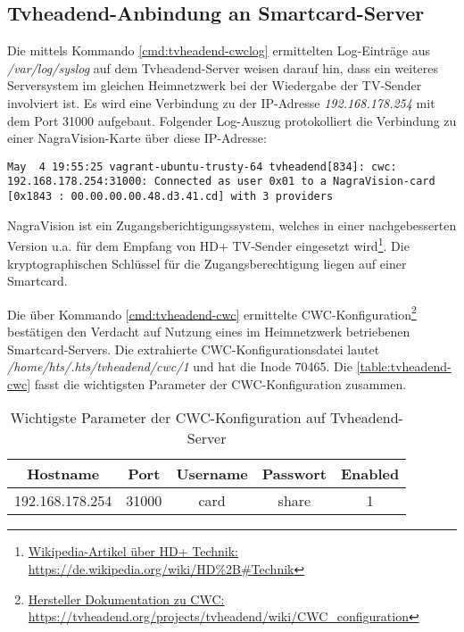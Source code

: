 \subsection{Tvheadend-Anbindung an Smartcard-Server}

Die mittels Kommando \autoref{cmd:tvheadend-cwclog} ermittelten Log-Einträge aus \textit{/var/log/syslog} auf dem Tvheadend-Server weisen darauf hin, dass ein weiteres Serversystem im gleichen Heimnetzwerk bei der Wiedergabe der TV-Sender involviert ist. Es wird eine Verbindung zu der IP-Adresse  \textit{192.168.178.254} mit dem Port 31000 aufgebaut. Folgender Log-Auszug protokolliert die Verbindung zu einer NagraVision-Karte über diese IP-Adresse:

\begin{Verbatim}[fontsize=\tiny]
May  4 19:55:25 vagrant-ubuntu-trusty-64 tvheadend[834]: cwc: 192.168.178.254:31000: Connected as user 0x01 to a NagraVision-card [0x1843 : 00.00.00.00.48.d3.41.cd] with 3 providers
\end{Verbatim}

NagraVision ist ein Zugangsberichtigungssystem, welches in einer nachgebesserten Version u.a. für dem Empfang von HD+ TV-Sender eingesetzt wird\footnote{\href{https://de.wikipedia.org/wiki/HD\%2B\#Technik}{Wikipedia-Artikel über HD+ Technik: https://de.wikipedia.org/wiki/HD\%2B\#Technik}}. Die kryptographischen Schlüssel für die Zugangsberechtigung liegen auf einer Smartcard.

Die über Kommando \autoref{cmd:tvheadend-cwc} ermittelte CWC-Konfiguration\footnote{\href{https://tvheadend.org/projects/tvheadend/wiki/CWC\_configuration}{Hersteller Dokumentation zu CWC: https://tvheadend.org/projects/tvheadend/wiki/CWC\_configuration}} bestätigen den Verdacht auf Nutzung eines im Heimnetzwerk betriebenen Smartcard-Servers. Die extrahierte CWC-Konfigurationsdatei lautet \textit{/home/hts/.hts/tvheadend/cwc/1} und hat die Inode 70465. Die \autoref{table:tvheadend-cwc} fasst die wichtigsten Parameter der CWC-Konfiguration zusammen.

\begin{table}[H]
\centering
\begin{tabular}{ccccc}
\hline 
Hostname & Port & Username & Passwort & Enabled \\ 
\hline 
192.168.178.254 & 31000 & card & share & 1 \\ 
\hline 
\end{tabular}
\caption{Wichtigste Parameter der CWC-Konfiguration auf Tvheadend-Server}
\label{table:tvheadend-cwc}
\end{table}

